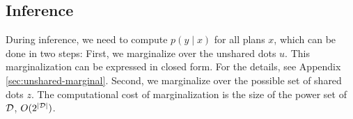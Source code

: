 \documentclass[11pt]{article}
\newcommand{\daniel}[1]{{{\textcolor{brown}{(Daniel: #1)}}}}
\newcommand{\srush}[1]{{{\textcolor{green}{(Sasha: #1)}}}}
\begin{document}




\subsection{Inference}
\label{sec:inference}


During inference, we need to compute $p(y \mid x)$ for all plans $x$,
which can be done in two steps: First, we marginalize over the unshared dots $u$.
This marginalization can be expressed in closed form.
For the details, see Appendix \ref{sec:unshared-marginal}.
Second, we marginalize over the possible set of shared dots $z$.
The computational cost of marginalization is the size of the power set of $\mathcal{D}$, $O(2^{|\mathcal{D}|})$.
\end{document}
